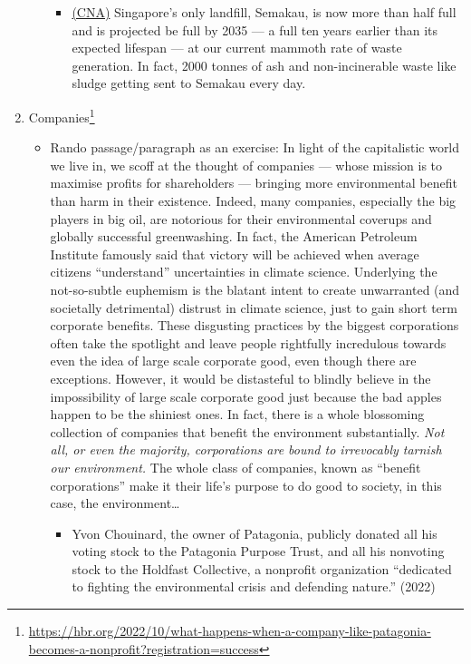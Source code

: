 \documentclass[oneside]{book}
\begin{document}
\begin{enumerate}
\begin{itemize}
\begin{itemize}
            \item \href{https://www.channelnewsasia.com/singapore/semakau-landfill-filling-waste-management-incineration-reduce-reuse-recycle-3909436}{(CNA)} Singapore's only landfill, Semakau, is now more than half full and is projected be full by 2035 --- a full ten years earlier than its expected lifespan --- at our current mammoth rate of waste generation. In fact, 2000 tonnes of ash and non-incinerable waste like sludge getting sent to Semakau every day. 
        \end{itemize}
    \end{itemize}
        \item Companies\footnote{\url{https://hbr.org/2022/10/what-happens-when-a-company-like-patagonia-becomes-a-nonprofit?registration=success}}
    \begin{itemize}
        \item Rando passage/paragraph as an exercise: In light of the capitalistic world we live in, we scoff at the thought of companies --- whose mission is to maximise profits for shareholders --- bringing more environmental benefit than harm in their existence. Indeed, many companies, especially the big players in big oil, are notorious for their environmental coverups and globally successful greenwashing. In fact, the American Petroleum Institute famously said that victory will be achieved when average citizens ``understand'' uncertainties in climate science. Underlying the not-so-subtle euphemism is the blatant intent to create unwarranted (and societally detrimental) distrust in climate science, just to gain short term corporate benefits. These disgusting practices by the biggest corporations often take the spotlight and leave people rightfully incredulous towards even the idea of large scale corporate good, even though there are exceptions. However, it would be distasteful to blindly believe in the impossibility of large scale corporate good just because the bad apples happen to be the shiniest ones. In fact, there is a whole blossoming collection of companies that benefit the environment substantially. \emph{Not all, or even the majority, corporations are bound to irrevocably tarnish our environment.} The whole class of companies, known as ``benefit corporations'' make it their life's purpose to do good to society, in this case, the environment\ldots
        \begin{itemize}
            \item Yvon Chouinard, the owner of Patagonia, publicly donated all his voting stock to the Patagonia Purpose Trust, and all his nonvoting stock to the Holdfast Collective, a nonprofit organization “dedicated to fighting the environmental crisis and defending nature.” (2022)

\end{itemize}
\end{itemize}
\end{enumerate}
\end{document}
